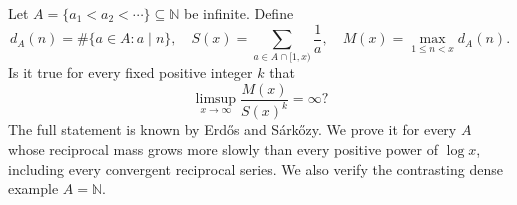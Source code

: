 Let $A=\{a_1<a_2<\cdots\}\subseteq\mathbb N$ be infinite. Define
\[d_A(n)=\#\{a\in A:a\mid n\},\quad
S(x)=\sum_{a\in A\cap[1,x)}\frac1a,\quad
M(x)=\max_{1\le n<x}d_A(n).\]
Is it true for every fixed positive integer $k$ that
\[\limsup_{x\to\infty}\frac{M(x)}{S(x)^k}=\infty?\tag{1}\]
The full statement is known by Erd\H{o}s and S\'ark\H{o}zy. We prove it for every $A$ whose reciprocal mass grows more slowly than every positive power of $\log x$, including every convergent reciprocal series. We also verify the contrasting dense example $A=\mathbb N$.
